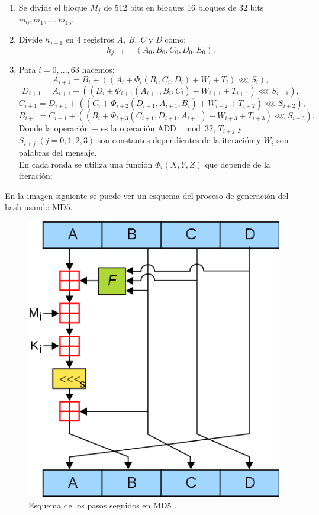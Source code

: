 \begin{enumerate}
	\item Se divide el bloque $M_j$ de 512 bits en bloques 16 bloques de 32 bits $m_0,m_1,...,m_{15}$. 
\item Divide $h_{j-1}$ en 4 registros \emph{A, B, C} y \emph{D} como:
	$$
		h_{j-1} = (A_0, B_0, C_0, D_0, E_0).
	$$
	\item Para $i=0,...,63$ hacemos:
	$$
		A_{i+1}=B_i+((A_i+\Phi_i(B_i,C_i,D_i)+W_i+T_i)\lll S_i),
	$$
	$$
		D_{i+1}=A_{i+1}+((D_i+\Phi_{i+1}(A_{i+1},B_i,C_i)+W_{i+1}+T_{i+1})\lll S_{i+1}),
	$$
	$$
		C_{i+1}=D_{i+1}+((C_i+\Phi_{i+2}(D_{i+1},A_{i+1},B_i)+W_{i+2}+T_{i+2})\lll S_{i+2}),
	$$
	$$
		B_{i+1}=C_{i+1}+((B_i+\Phi_{i+3}(C_{i+1},D_{i+1},A_{i+1})+W_{i+3}+T_{i+3})\lll S_{i+3}).
	$$
	Donde la operación $+$ es la operación ADD $\mod 32$, $T_{i+j}$ y $S_{i+j}\; (j=0,1,2,3)$ son constantes dependientes de la iteración y $W_i$ son palabras del mensaje.\\
	En cada ronda se utiliza una función $\Phi_i(X,Y,Z)$ que depende de la iteración:
\end{enumerate}
En la imagen siguiente se puede ver un esquema del proceso de generación del hash usando MD5.
\begin{figure}[htb]
	\centering
	\includegraphics[scale=0.5]{imagenes/md5.png} 
	\caption{Esquema de los pasos seguidos en MD5 \cite{fotosmd5}.}
\end{figure}

